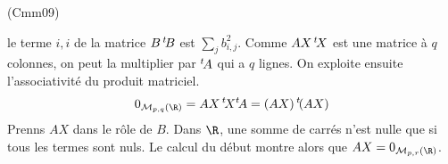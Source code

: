 \begin{tiny}(Cmm09)\end{tiny} le terme $i,i$ de la matrice $B\,\mathstrut^t\! B$ est $\sum_{j}b_{i,j}^2$.\newline
Comme $AX\,\mathstrut^t\!X$ est une matrice à $q$ colonnes, on peut la multiplier par $\mathstrut^t\!A$ qui a $q$ lignes. On exploite ensuite l'associativité du produit matriciel.
\begin{displaymath}
 0_{\mathcal M_{p,q}(\R)}=AX\,\mathstrut^t\!X\mathstrut^t\!A= (AX)\,\mathstrut^t\!(AX)
\end{displaymath}
 Prenns $AX$ dans le rôle de $B$. Dans $\R$, une somme de carrés n'est nulle que si tous les termes sont nuls. Le calcul du début montre alors que $AX=0_{\mathcal M_{p,r}(\R)}$.
